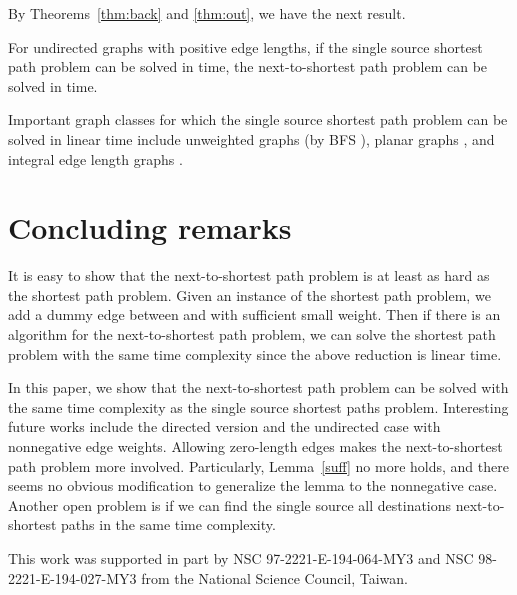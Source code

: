 By Theorems~\ref{thm:back} and \ref{thm:out}, we have the next result.
\begin{corollary}
For undirected graphs with positive edge lengths, if the single source shortest path problem can be solved in  time, the next-to-shortest path problem can be solved in  time.
\end{corollary}
Important graph classes for which the single source shortest path problem can be solved in linear time include unweighted graphs (by BFS \cite{cor01}), planar graphs \cite{hen97}, and integral edge length graphs \cite{thr99}.

\section{Concluding remarks}

It is easy to show that the next-to-shortest path problem is at least as hard as the shortest path problem.
Given an instance of the shortest path problem, we add a dummy edge between  and  with sufficient small weight.
Then if there is an algorithm for the next-to-shortest path problem, we can solve the shortest path problem with the same time complexity since the above reduction is linear time.

In this paper, we show that the next-to-shortest path problem can be solved with the same time complexity as the single source shortest paths problem. 
Interesting future works include the directed version and the undirected case with nonnegative edge weights. 
Allowing zero-length edges makes the next-to-shortest path problem more involved. 
Particularly, Lemma~\ref{suff} no more holds, and there seems no obvious modification to generalize the lemma to the nonnegative case.  
Another open problem is if we can find the single source all destinations next-to-shortest paths in the same time complexity.


\begin{acknowledgements}
This work was supported in part by 
NSC 97-2221-E-194-064-MY3 and NSC 98-2221-E-194-027-MY3 from the National Science Council, Taiwan.
\end{acknowledgements}

